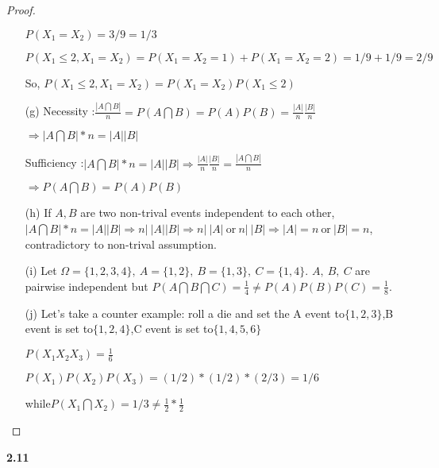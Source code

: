\begin{proof}
\begin{enumerate}
$P(X_1 = X_2)=3/9=1/3$

$P(X_1 \leq 2,X_1 = X_2)=P(X_1 = X_2=1)+P(X_1 = X_2=2)=1/9+1/9=2/9$

So, $P(X_1 \leq 2,X_1 = X_2)=P(X_1 = X_2)P(X_1 \leq 2)$

\item[(g)]Necessity :$\frac{|A\bigcap B|}{n}=P(A \bigcap B)=P(A)P(B)=\frac{|A|}{n}\frac{|B|}{n}$

$\Rightarrow |A\bigcap B|*n = |A||B|$

Sufficiency :$|A\bigcap B|*n = |A||B|\Rightarrow \frac{|A|}{n}\frac{|B|}{n}=\frac{|A\bigcap B|}{n}$

$\Rightarrow P(A \bigcap B)=P(A)P(B)$

\item[(h)] If $A,B$ are two non-trival events independent to each other, $|A\bigcap B|*n = |A||B|\Rightarrow n|\  |A||B| \Rightarrow n|\ |A| \ \text{or}\  n |\ |B| \Rightarrow |A| = n\ \text{or}\ |B| = n$, contradictory to non-trival assumption.
   
\item[(i)] Let $\Omega = \{1,2,3,4\},\ A = \{1,2\},\ B = \{1,3\},\ C = \{1,4\}$. $A,\ B,\ C$ are pairwise independent but $P(A\bigcap B \bigcap C) = \frac{1}{4} \neq P(A) P(B)P(C) = \frac{1}{8}$.

\item[(j)]Let's take a counter example: roll a die and set the A event to$\{1,2,3\}$,B event is set to$\{1,2,4\}$,C event is set to$\{1,4,5,6\}$

$P(X_1 X_2 X_3)=\frac{1}{6}$

$P(X_1)P(X_2)P(X_3)=(1/2)*(1/2)*(2/3)=1/6$

while$P(X_1\bigcap X_2)=1/3\neq \frac{1}{2}*\frac{1}{2}$
\end{enumerate}
\end{proof}

\noindent\textbf{2.11}

